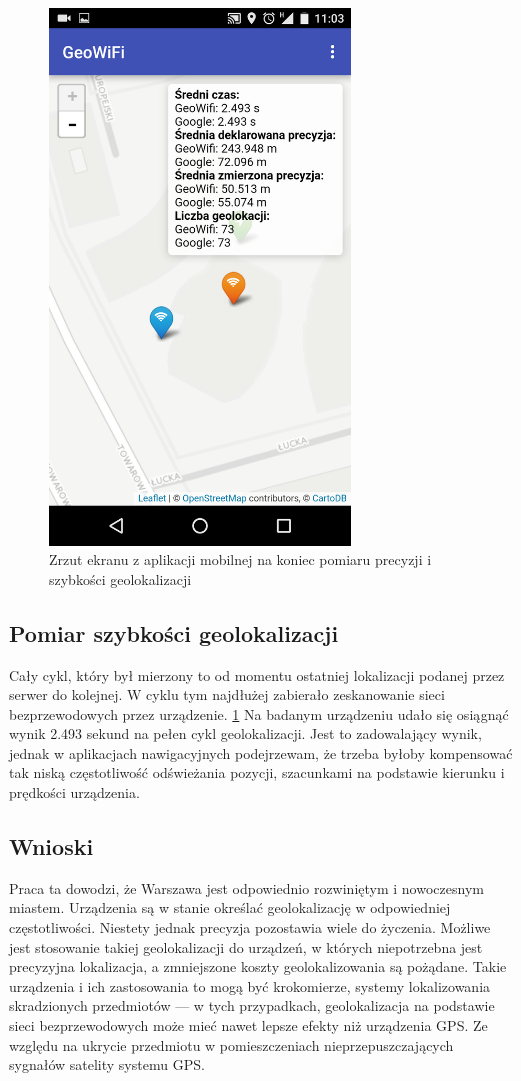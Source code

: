 \begin{figure}
  \centering
    \includegraphics[width=8cm]{images/map-result}
  \caption{Zrzut ekranu z aplikacji mobilnej na koniec pomiaru precyzji i szybkości geolokalizacji}
  \label{fig:mapResult}
\end{figure}

\subsection{Pomiar szybkości geolokalizacji}
Cały cykl, który był mierzony to od momentu ostatniej lokalizacji podanej przez serwer do kolejnej. W cyklu tym najdłużej zabierało zeskanowanie sieci bezprzewodowych przez urządzenie. \ref{fig:mapResult} Na badanym urządzeniu udało się osiągnąć wynik 2.493 sekund na pełen cykl geolokalizacji. Jest to zadowalający wynik, jednak w aplikacjach nawigacyjnych podejrzewam, że trzeba byłoby kompensować tak niską częstotliwość odświeżania pozycji, szacunkami na podstawie kierunku i prędkości urządzenia.

\subsection{Wnioski}
Praca ta dowodzi, że Warszawa jest odpowiednio rozwiniętym i nowoczesnym miastem. Urządzenia są w stanie określać geolokalizację w odpowiedniej częstotliwości. Niestety jednak precyzja pozostawia wiele do życzenia. Możliwe jest stosowanie takiej geolokalizacji do urządzeń, w których niepotrzebna jest precyzyjna lokalizacja, a zmniejszone koszty geolokalizowania są pożądane. Takie urządzenia i ich zastosowania to mogą być krokomierze, systemy lokalizowania skradzionych przedmiotów — w tych przypadkach, geolokalizacja na podstawie sieci bezprzewodowych może mieć nawet lepsze efekty niż urządzenia GPS. Ze względu na ukrycie przedmiotu w pomieszczeniach nieprzepuszczających sygnałów satelity systemu GPS.

